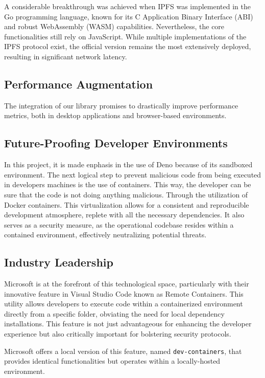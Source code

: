 \documentclass[10pt,journal,compsoc]{IEEEtran}
\begin{document}
A considerable breakthrough was achieved when IPFS was implemented in the Go programming language, known for its C Application Binary Interface (ABI) and robust WebAssembly (WASM) capabilities. Nevertheless, the core functionalities still rely on JavaScript. While multiple implementations of the IPFS protocol exist, the official version remains the most extensively deployed, resulting in significant network latency.

\subsection{Performance Augmentation}

The integration of our library promises to drastically improve performance metrics, both in desktop applications and browser-based environments.

\subsection{Future-Proofing Developer Environments}

In this project, it is made enphasis in the use of Deno because of its sandboxed environment. The next logical step to prevent malicious code from being executed in developers machines is the use of containers. This way, the developer can be sure that the code is not doing anything malicious. Through the utilization of Docker containers. This virtualization allows for a consistent and reproducible development atmosphere, replete with all the necessary dependencies. It also serves as a security measure, as the operational codebase resides within a contained environment, effectively neutralizing potential threats.

\subsection{Industry Leadership}

Microsoft is at the forefront of this technological space, particularly with their innovative feature in Visual Studio Code known as Remote Containers. This utility allows developers to execute code within a containerized environment directly from a specific folder, obviating the need for local dependency installations. This feature is not just advantageous for enhancing the developer experience but also critically important for bolstering security protocols.

Microsoft offers a local version of this feature, named \verb|dev-containers|, that provides identical functionalities but operates within a locally-hosted environment.

\end{document}
